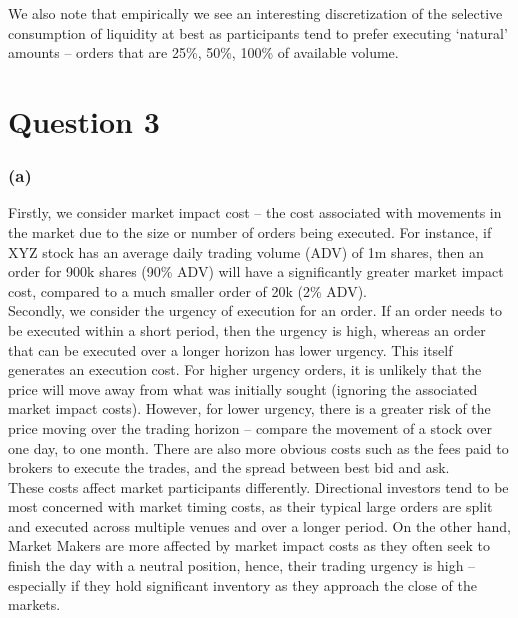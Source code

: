 \documentclass{article}
\begin{document}
We also note that empirically we see an interesting discretization of the selective consumption of liquidity at best as participants tend to prefer executing ‘natural’ amounts – orders that are 25\%, 50\%, 100\% of available volume. 


\newpage
\section*{Question 3} 

\subsubsection*{(a)}
Firstly, we consider market impact cost – the cost associated with movements in the market due to the size or number of orders being executed. For instance, if XYZ stock has an average daily trading volume (ADV) of 1m shares, then an order for 900k shares (90\% ADV) will have a significantly greater market impact cost, compared to a much smaller order of 20k (2\% ADV). \\

Secondly, we consider the urgency of execution for an order. If an order needs to be executed within a short period, then the urgency is high, whereas an order that can be executed over a longer horizon has lower urgency. This itself generates an execution cost. For higher urgency orders, it is unlikely that the price will move away from what was initially sought (ignoring the associated market impact costs). However, for lower urgency, there is a greater risk of the price moving over the trading horizon – compare the movement of a stock over one day, to one month. There are also more obvious costs such as the fees paid to brokers to execute the trades, and the spread between best bid and ask. \\

These costs affect market participants differently. Directional investors tend to be most concerned with market timing costs, as their typical large orders are split and executed across multiple venues and over a longer period. On the other hand, Market Makers are more affected by market impact costs as they often seek to finish the day with a neutral position, hence, their trading urgency is high – especially if they hold significant inventory as they approach the close of the markets. \\

\end{document}
